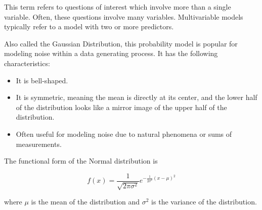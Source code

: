\documentclass[
  letterpaper,
  DIV=11,
  numbers=noendperiod]{scrreprt}
\providecommand{\tightlist}{%
  \setlength{\itemsep}{0pt}\setlength{\parskip}{0pt}}\usepackage{longtable,booktabs,array}
\theoremstyle{plain}
\theoremstyle{definition}
\theoremstyle{definition}
\theoremstyle{remark}
\begin{document}
\begin{description}
\tightlist
\item[Multivariable (Definition~\ref{def-multivariable})]
This term refers to questions of interest which involve more than a
single variable. Often, these questions involve many variables.
Multivariable models typically refer to a model with two or more
predictors.
\item[Normal Distribution (Definition~\ref{def-normal-distribution})]
Also called the Gaussian Distribution, this probability model is popular
for modeling noise within a data generating process. It has the
following characteristics:
\end{description}

\begin{itemize}
\tightlist
\item
  It is bell-shaped.
\item
  It is symmetric, meaning the mean is directly at its center, and the
  lower half of the distribution looks like a mirror image of the upper
  half of the distribution.
\item
  Often useful for modeling noise due to natural phenomena or sums of
  measurements.
\end{itemize}

The functional form of the Normal distribution is

\[f(x) = \frac{1}{\sqrt{2\pi\sigma^2}} e^{-\frac{1}{2\sigma^2}(x - \mu)^2}\]

where \(\mu\) is the mean of the distribution and \(\sigma^2\) is the
variance of the distribution.
\end{document}
